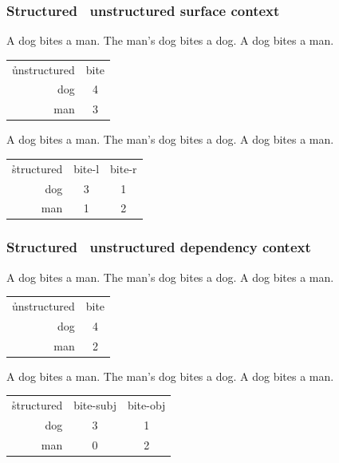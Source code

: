 \documentclass[t]{beamer} %
\begin{document}
\begin{frame}
  \frametitle{Structured \vs\ unstructured surface context}

  A dog bites a man. The man's dog bites a dog.  A dog bites a man.
  
 \begin{center}
    \begin{tabular}{r|c}
      \h{unstructured} &  bite \\
      dog & 4 \\
      man & 3 
    \end{tabular}
  \end{center}

  \gap[2]\pause
  A dog bites a man. The man's dog bites a dog.  A dog bites a man.
  
  \begin{center}
    \begin{tabular}{r|c|c}
      \h{structured} &  bite-l & bite-r \\
      dog & 3 & 1 \\
      man & 1  & 2
    \end{tabular}
  \end{center}
\end{frame}


\begin{frame}
  \frametitle{Structured \vs\ unstructured dependency context}

  A dog bites a man. The man's dog bites a dog.  A dog bites a man.
  
  \begin{center}
    \begin{tabular}{r|c}
      \h{unstructured} &  bite \\
      dog & 4 \\
      man & 2 
    \end{tabular}
  \end{center}

  \gap[2]\pause
  A dog bites a man. The man's dog bites a dog.  A dog bites a man.
  
   \begin{center}
     \begin{tabular}{r|c|c}
       \h{structured} &  bite-subj & bite-obj \\
       dog & 3 & 1 \\
       man & 0  & 2
     \end{tabular}
   \end{center}
\end{frame}
\end{document}
